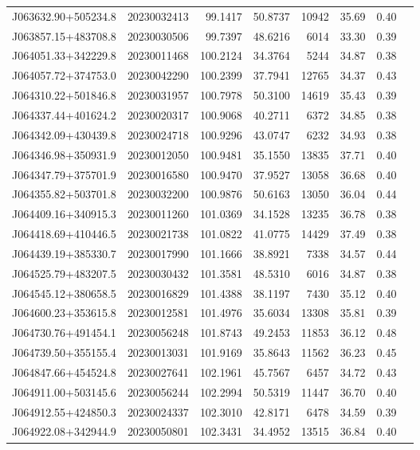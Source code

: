 \documentclass{article}
\begin{document}
\begin {longtable}{|l|l|r|r|r|r|r|l|}
 J063632.90+505234.8&  20230032413&   99.1417&   50.8737& 10942& 35.69& 0.40&\\
 J063857.15+483708.8&  20230030506&   99.7397&   48.6216&  6014& 33.30& 0.39&\\
 J064051.33+342229.8&  20230011468&  100.2124&   34.3764&  5244& 34.87& 0.38&\\
 J064057.72+374753.0&  20230042290&  100.2399&   37.7941& 12765& 34.37& 0.43&\\
 J064310.22+501846.8&  20230031957&  100.7978&   50.3100& 14619& 35.43& 0.39&\\
 J064337.44+401624.2&  20230020317&  100.9068&   40.2711&  6372& 34.85& 0.38&\\
 J064342.09+430439.8&  20230024718&  100.9296&   43.0747&  6232& 34.93& 0.38&\\
 J064346.98+350931.9&  20230012050&  100.9481&   35.1550& 13835& 37.71& 0.40&\\
 J064347.79+375701.9&  20230016580&  100.9470&   37.9527& 13058& 36.68& 0.40&\\
 J064355.82+503701.8&  20230032200&  100.9876&   50.6163& 13050& 36.04& 0.44&\\
 J064409.16+340915.3&  20230011260&  101.0369&   34.1528& 13235& 36.78& 0.38&\\
 J064418.69+410446.5&  20230021738&  101.0822&   41.0775& 14429& 37.49& 0.38&\\
 J064439.19+385330.7&  20230017990&  101.1666&   38.8921&  7338& 34.57& 0.44&\\
 J064525.79+483207.5&  20230030432&  101.3581&   48.5310&  6016& 34.87& 0.38&\\
 J064545.12+380658.5&  20230016829&  101.4388&   38.1197&  7430& 35.12& 0.40&\\
 J064600.23+353615.8&  20230012581&  101.4976&   35.6034& 13308& 35.81& 0.39&\\
 J064730.76+491454.1&  20230056248&  101.8743&   49.2453& 11853& 36.12& 0.48&\\
 J064739.50+355155.4&  20230013031&  101.9169&   35.8643& 11562& 36.23& 0.45&\\
 J064847.66+454524.8&  20230027641&  102.1961&   45.7567&  6457& 34.72& 0.43&\\
 J064911.00+503145.6&  20230056244&  102.2994&   50.5319& 11447& 36.70& 0.40&\\
 J064912.55+424850.3&  20230024337&  102.3010&   42.8171&  6478& 34.59& 0.39&\\
 J064922.08+342944.9&  20230050801&  102.3431&   34.4952& 13515& 36.84& 0.40&\\

\end{longtable}
\end{document}
